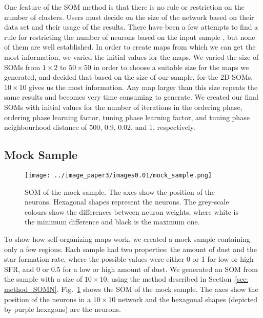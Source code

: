      One feature of the SOM method is that there is no rule or restriction on the number of clusters.
     Users must decide on the size of the network based on their data set and their usage of the results.
     There have been a few attempts to find a rule for restricting the number of neurons based on the input sample \citep[e.g.][]{Vesanto05}, but none of them are well established. 
     In order to create maps from which we can get the most information, we varied the initial values for the maps.
     We varied the size of SOMs from $1\times2$ to $50\times50$ in order to choose a suitable size for the maps we generated, and decided that based on the size of our sample, for the 2D SOMs, $10\times10$ gives us the most information.
     Any map larger than this size repeats the same results and becomes very time consuming to generate.
     We created our final SOMs with initial values for the number of iterations in the ordering phase, ordering phase learning factor, tuning phase learning factor, and tuning phase neighbourhood distance of 500, 0.9, 0.02, and 1, respectively. 
    

\subsection{Mock Sample}
\label{sec: mock_sample}
 
         \begin{figure}
                \centering
                \texttt{[image: ../image\_paper3/images0.01/mock\_sample.png]}
            \caption[Self-organizing map of the mock sample]{SOM of the mock sample. The axes show the position of the neurons. Hexagonal shapes represent the neurons. The grey-scale colours show the differences between neuron weights, where white is the minimum difference and black is the maximum one.}
            \label{fig: sample}
        \end{figure}
 
To show how self-organizing maps work, we created a mock sample containing only a few regions.
Each sample had two properties: the amount of dust and the star formation rate, where the possible values were
either 0 or 1 for low or high SFR, and 0 or 0.5 for a low or high amount of dust. 
We generated an SOM from the sample with a size of $10 \times 10$, using the method described in Section~\ref{sec: method_SOMN}.
Fig.~\ref{fig: sample} shows the SOM of the mock sample. 
The axes show the position of the neurons in a $10 \times 10$ network and the hexagonal shapes (depicted by purple hexagons) are the neurons.
 
